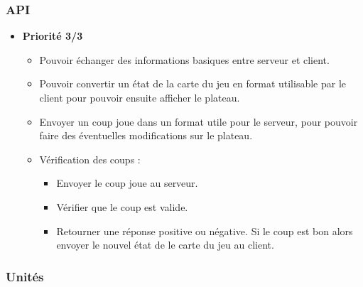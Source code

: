\documentclass{article}[a4paper, 12pt]
\begin{document}
\subsubsection{API}
\begin{itemize}
    \item \textbf{Priorité 3/3}
    \begin{itemize}
        \item Pouvoir échanger des informations basiques entre serveur et client.
        \item Pouvoir convertir un état de la carte du jeu en format utilisable par le client pour pouvoir ensuite afficher le plateau.
        \item Envoyer un coup joue dans un format utile pour le serveur, pour pouvoir faire des éventuelles modifications sur le plateau.
        \item Vérification des coups :
        \begin{itemize}
            \item Envoyer le coup joue au serveur.
            \item Vérifier que le coup est valide.
            \item Retourner une réponse positive ou négative. Si le coup est bon alors envoyer le nouvel état de le carte du jeu au client.
        \end{itemize}
    \end{itemize}
\end{itemize}

\subsubsection{Unités}
\end{document}

